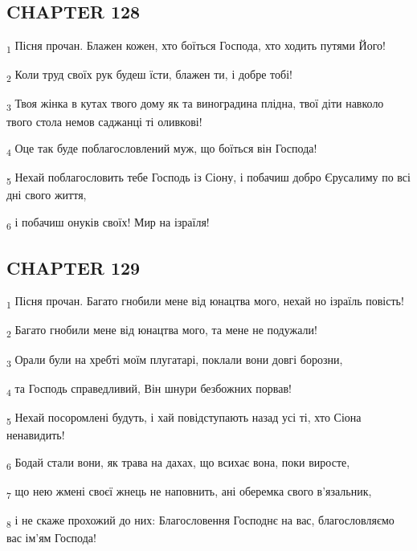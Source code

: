 \subsection{CHAPTER 128}
\begin{tcolorbox}
\textsubscript{1} Пісня прочан. Блажен кожен, хто боїться Господа, хто ходить путями Його!
\end{tcolorbox}
\begin{tcolorbox}
\textsubscript{2} Коли труд своїх рук будеш їсти, блажен ти, і добре тобі!
\end{tcolorbox}
\begin{tcolorbox}
\textsubscript{3} Твоя жінка в кутах твого дому як та виноградина плідна, твої діти навколо твого стола немов саджанці ті оливкові!
\end{tcolorbox}
\begin{tcolorbox}
\textsubscript{4} Оце так буде поблагословлений муж, що боїться він Господа!
\end{tcolorbox}
\begin{tcolorbox}
\textsubscript{5} Нехай поблагословить тебе Господь із Сіону, і побачиш добро Єрусалиму по всі дні свого життя,
\end{tcolorbox}
\begin{tcolorbox}
\textsubscript{6} і побачиш онуків своїх! Мир на ізраїля!
\end{tcolorbox}
\subsection{CHAPTER 129}
\begin{tcolorbox}
\textsubscript{1} Пісня прочан. Багато гнобили мене від юнацтва мого, нехай но ізраїль повість!
\end{tcolorbox}
\begin{tcolorbox}
\textsubscript{2} Багато гнобили мене від юнацтва мого, та мене не подужали!
\end{tcolorbox}
\begin{tcolorbox}
\textsubscript{3} Орали були на хребті моїм плугатарі, поклали вони довгі борозни,
\end{tcolorbox}
\begin{tcolorbox}
\textsubscript{4} та Господь справедливий, Він шнури безбожних порвав!
\end{tcolorbox}
\begin{tcolorbox}
\textsubscript{5} Нехай посоромлені будуть, і хай повідступають назад усі ті, хто Сіона ненавидить!
\end{tcolorbox}
\begin{tcolorbox}
\textsubscript{6} Бодай стали вони, як трава на дахах, що всихає вона, поки виросте,
\end{tcolorbox}
\begin{tcolorbox}
\textsubscript{7} що нею жмені своєї жнець не наповнить, ані оберемка свого в'язальник,
\end{tcolorbox}
\begin{tcolorbox}
\textsubscript{8} і не скаже прохожий до них: Благословення Господнє на вас, благословляємо вас ім'ям Господа!
\end{tcolorbox}
